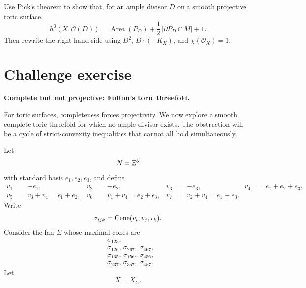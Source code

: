 \begin{exercises}
\item Use Pick's theorem to show that, for an ample divisor \(D\) on a
smooth projective toric surface,
\[
h^0(X,\mathcal O(D))
=
\operatorname{Area}(P_D)
+\frac12\,|\partial P_D\cap M|
+1.
\]
Then rewrite the right-hand side using \(D^2\), \(D\cdot(-K_X)\), and
\(\chi(\mathcal O_X)=1\).

\end{exercises}

\clearpage
\section*{Challenge exercise}

\noindent
\textbf{Complete but not projective: Fulton's toric threefold.}

\medskip

For toric surfaces, completeness forces projectivity. We now explore
a smooth complete toric threefold for which no ample divisor exists.
The obstruction will be a cycle of strict-convexity inequalities that
cannot all hold simultaneously.

Let
\[
N=\mathbb{Z}^3
\]
with standard basis \(e_1,e_2,e_3\), and define
\[
\begin{aligned}
v_1&=-e_1,&
 v_2&=-e_2,&
 v_3&=-e_3,&
 v_4&=e_1+e_2+e_3,
\\
v_5&=v_3+v_4=e_1+e_2,&
 v_6&=v_1+v_4=e_2+e_3,&
 v_7&=v_2+v_4=e_1+e_3.
\end{aligned}
\]
Write
\[
\sigma_{ijk}=\operatorname{Cone}(v_i,v_j,v_k).
\]
Consider the fan \(\Sigma\) whose maximal cones are
\[
\begin{aligned}
&\sigma_{123},
\\
&\sigma_{126},\ \sigma_{267},\ \sigma_{467},
\\
&\sigma_{135},\ \sigma_{156},\ \sigma_{456},
\\
&\sigma_{237},\ \sigma_{357},\ \sigma_{457}.
\end{aligned}
\]
Let
\[
X=X_\Sigma.
\]


